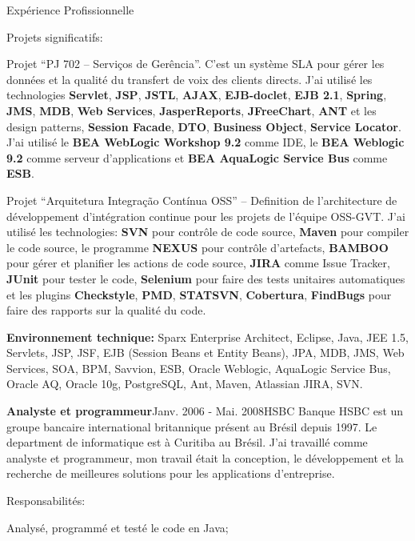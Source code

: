 \documentclass{resume}
\begin{document}
\begin{rSection}{Expérience Profissionnelle}
\begin{rSubsection}{Projets significatifs:}{}{}{}
    \item Projet “PJ 702 – Serviços de Gerência”. C’est un système SLA pour gérer les données et la qualité du transfert de voix des clients directs. J’ai utilisé les technologies \textbf{Servlet}, \textbf{JSP}, \textbf{JSTL}, \textbf{AJAX}, \textbf{EJB-doclet}, \textbf{EJB 2.1}, \textbf{Spring}, \textbf{JMS}, \textbf{MDB}, \textbf{Web Services}, \textbf{JasperReports}, \textbf{JFreeChart}, \textbf{ANT} et les design patterns, \textbf{Session Facade}, \textbf{DTO}, \textbf{Business Object}, \textbf{Service Locator}. J'ai utilisé le \textbf{BEA WebLogic Workshop 9.2} comme IDE, le \textbf{BEA Weblogic 9.2} comme serveur d'applications et \textbf{BEA AquaLogic Service Bus} comme \textbf{ESB}.\\
    \item Projet “Arquitetura Integração Contínua OSS” – Definition de l’architecture de développement d’intégration continue pour les projets de l'équipe OSS-GVT. J'ai utilisé les technologies: \textbf{SVN} pour contrôle de code source, \textbf{Maven} pour compiler le code source, le programme \textbf{NEXUS} pour contrôle d'artefacts, \textbf{BAMBOO} pour gérer et planifier les actions de code source, \textbf{JIRA} comme Issue Tracker, \textbf{JUnit} pour tester le code, \textbf{Selenium} pour faire des tests unitaires automatiques et les plugins \textbf{Checkstyle}, \textbf{PMD}, \textbf{STATSVN}, \textbf{Cobertura}, \textbf{FindBugs} pour faire des rapports sur la qualité du code.
    \end{rSubsection}
    
    {\fontsize{8}{9}\selectfont \textbf{Environnement technique:} Sparx Enterprise Architect, Eclipse, Java, JEE 1.5, Servlets, JSP, JSF, EJB (Session Beans et Entity Beans), JPA, MDB, JMS, Web Services, SOA, BPM, Savvion, ESB, Oracle Weblogic, AquaLogic Service Bus, Oracle AQ, Oracle 10g, PostgreSQL, Ant, Maven, Atlassian JIRA, SVN.}

    \begin{rSubsection}{\bf Analyste et programmeur}{Janv. 2006 - Mai. 2008}{HSBC Banque}{}
      HSBC est un groupe bancaire international britannique présent au Brésil depuis 1997. Le department de informatique est à Curitiba au Brésil. J'ai travaillé comme analyste et programmeur, mon travail était la conception, le développement et la recherche de meilleures solutions pour les applications d'entreprise.
    \end{rSubsection}
    \begin{rSubsection}{Responsabilités:}{}{}{}
      \item Analysé, programmé et testé le code en Java;


\end{rSubsection}
\end{rSection}
\end{document}
